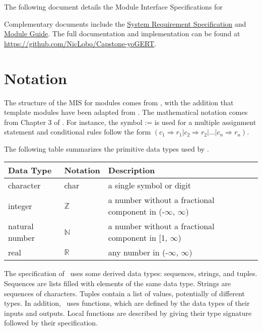 \documentclass[12pt, titlepage]{article}
\begin{document}
The following document details the Module Interface Specifications for

Complementary documents include the \href{https://github.com/NicLobo/Capstone-yoGERT/blob/main/docs/SRS/SRS.pdf}{System Requirement Specification}
and \href{https://github.com/NicLobo/Capstone-yoGERT/blob/main/docs/Design/SoftArchitecture/MG.pdf}{Module Guide}. The full documentation and implementation can be
found at \url{https://github.com/NicLobo/Capstone-yoGERT}.  %

\section{Notation}


The structure of the MIS for modules comes from \citet{HoffmanAndStrooper1995},
with the addition that template modules have been adapted from
\cite{GhezziEtAl2003}.  The mathematical notation comes from Chapter 3 of
\citet{HoffmanAndStrooper1995}.  For instance, the symbol := is used for a
multiple assignment statement and conditional rules follow the form $(c_1
\Rightarrow r_1 | c_2 \Rightarrow r_2 | ... | c_n \Rightarrow r_n )$.

The following table summarizes the primitive data types used by \progname. 

\begin{center}
\renewcommand{\arraystretch}{1.2}
\noindent 
\begin{tabular}{l l p{7.5cm}} 
\toprule 
\textbf{Data Type} & \textbf{Notation} & \textbf{Description}\\ 
\midrule
character & char & a single symbol or digit\\
integer & $\mathbb{Z}$ & a number without a fractional component in (-$\infty$, $\infty$) \\
natural number & $\mathbb{N}$ & a number without a fractional component in [1, $\infty$) \\
real & $\mathbb{R}$ & any number in (-$\infty$, $\infty$)\\
\bottomrule
\end{tabular} 
\end{center}

\noindent
The specification of \progname \ uses some derived data types: sequences, strings, and
tuples. Sequences are lists filled with elements of the same data type. Strings
are sequences of characters. Tuples contain a list of values, potentially of
different types. In addition, \progname \ uses functions, which
are defined by the data types of their inputs and outputs. Local functions are
described by giving their type signature followed by their specification.
\end{document}
